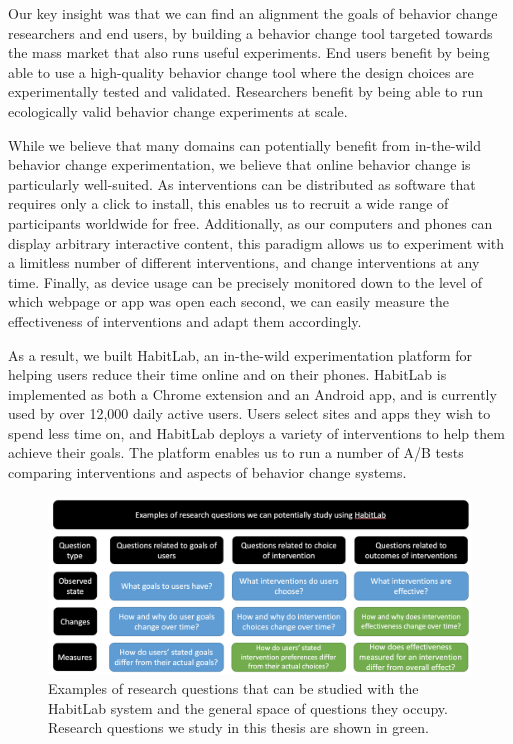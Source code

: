 Our key insight was that we can find an alignment the goals of behavior change researchers and end users, by building a behavior change tool targeted towards the mass market that also runs useful experiments. End users benefit by being able to use a high-quality behavior change tool where the design choices are experimentally tested and validated. Researchers benefit by being able to run ecologically valid behavior change experiments at scale.

While we believe that many domains can potentially benefit from in-the-wild behavior change experimentation, we believe that online behavior change is particularly well-suited. As interventions can be distributed as software that requires only a click to install, this enables us to recruit a wide range of participants worldwide for free. Additionally, as our computers and phones can display arbitrary interactive content, this paradigm allows us to experiment with a limitless number of different interventions, and change interventions at any time. Finally, as device usage can be precisely monitored down to the level of which webpage or app was open each second, we can easily measure the effectiveness of interventions and adapt them accordingly.

As a result, we built HabitLab, an in-the-wild experimentation platform for helping users reduce their time online and on their phones. HabitLab is implemented as both a Chrome extension and an Android app, and is currently used by over 12,000 daily active users. Users select sites and apps they wish to spend less time on, and HabitLab deploys a variety of interventions to help them achieve their goals. The platform enables us to run a number of A/B tests comparing interventions and aspects of behavior change systems.


\begin{figure}
  \includegraphics[width=\linewidth]{figuresI/researchquestions.png}
  \caption{Examples of research questions that can be studied with the HabitLab system and the general space of questions they occupy. Research questions we study in this thesis are shown in green.}
  \label{fig:researchquestions}
\end{figure}


